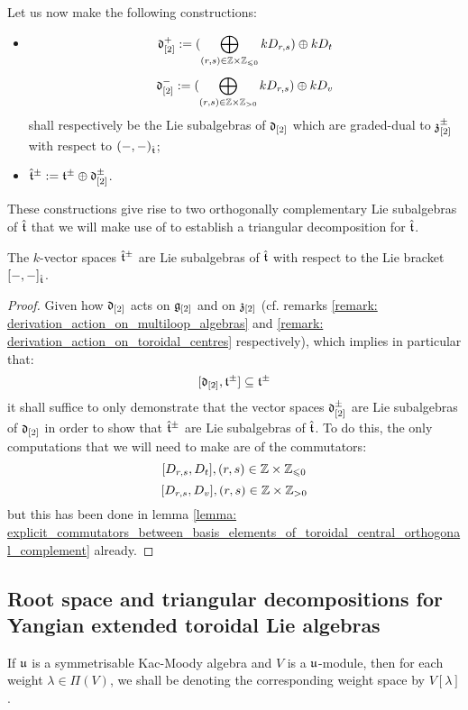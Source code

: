         Let us now make the following constructions:
        \begin{itemize}
            \item
                $$\d_{[2]}^+ := ( \bigoplus_{(r, s) \in \Z \x \Z_{\leq 0} } k D_{r, s} ) \oplus k D_t$$
                $$\d_{[2]}^- := ( \bigoplus_{(r, s) \in \Z \x \Z_{> 0} } k D_{r, s} ) \oplus k D_v$$
            shall respectively be the Lie subalgebras of $\mathfrak{d}_{[2]}$ which are graded-dual to $\mathfrak{z}_{[2]}^{\pm}$ with respect to $(-, -)_{\hat{\mathfrak{t}}}$;
            \item $\hat{\mathfrak{t}}^{\pm} := \mathfrak{t}^{\pm} \oplus \mathfrak{d}_{[2]}^{\pm}$.
        \end{itemize}
        These constructions give rise to two orthogonally complementary Lie subalgebras of $\hat{\mathfrak{t}}$ that we will make use of to establish a triangular decomposition for $\hat{\mathfrak{t}}$. 
        \begin{lemma} \label{lemma: positive/negative_extended_toroidal_lie_algebras}
            The $k$-vector spaces $\hat{\mathfrak{t}}^{\pm}$ are Lie subalgebras of $\hat{\mathfrak{t}}$ with respect to the Lie bracket $[-, -]_{\hat{\mathfrak{t}}}$.
        \end{lemma}
            \begin{proof}
                Given how $\mathfrak{d}_{[2]}$ acts on $\mathfrak{g}_{[2]}$ and on $\mathfrak{z}_{[2]}$ (cf. remarks \ref{remark: derivation_action_on_multiloop_algebras} and \ref{remark: derivation_action_on_toroidal_centres} respectively), which implies in particular that:
                    $$[\mathfrak{d}_{[2]}, \mathfrak{t}^{\pm}] \subseteq \mathfrak{t}^{\pm}$$
                it shall suffice to only demonstrate that the vector spaces $\mathfrak{d}_{[2]}^{\pm}$ are Lie subalgebras of $\mathfrak{d}_{[2]}$ in order to show that $\hat{\mathfrak{t}}^{\pm}$ are Lie subalgebras of $\hat{\mathfrak{t}}$. To do this, the only computations that we will need to make are of the commutators:
                    $$[D_{r, s}, D_t], (r, s) \in \Z \x \Z_{\leq 0}$$
                    $$[D_{r, s}, D_v], (r, s) \in \Z \x \Z_{> 0}$$
                but this has been done in lemma \ref{lemma: explicit_commutators_between_basis_elements_of_toroidal_central_orthogonal_complement} already.
            \end{proof}

    \subsection{Root space and triangular decompositions for Yangian extended toroidal Lie algebras}
        \begin{convention}
            If $\mathfrak{u}$ is a symmetrisable Kac-Moody algebra and $V$ is a $\mathfrak{u}$-module, then for each weight $\lambda \in \Pi(V)$, we shall be denoting the corresponding weight space by $V[\lambda]$.
        \end{convention}
    
